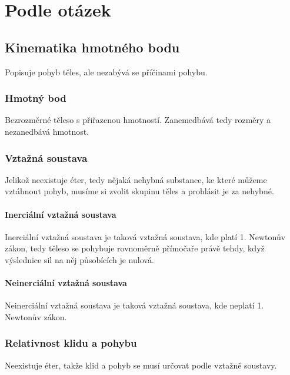 \documentclass[titlepage]{report}
\begin{document}
\part{Podle otázek}
\setcounter{chapter}{0}

\chapter{Kinematika hmotného bodu}
Popisuje pohyb těles, ale nezabývá se příčinami pohybu.
\section{Hmotný bod}
Bezrozměrné těleso s přiřazenou hmotností. Zanemedbává tedy rozměry a nezanedbává hmotnost.
\section{Vztažná soustava}
Jelikož neexistuje éter, tedy nějaká nehybná substance, ke které můžeme vztáhnout pohyb, musíme si zvolit skupinu těles a prohlásit je za nehybné.
\subsection{Inerciální vztažná soustava}
Inerciální vztažná soustava je taková vztažná soustava, kde platí 1. Newtonův zákon, tedy těleso se pohybuje rovnoměrně přímočaře právě tehdy, když výslednice sil na něj působících je nulová.
\subsection{Neinerciální vztažná soustava}
Neinerciální vztažná soustava je taková vztažná soustava, kde neplatí 1. Newtonův zákon.
\section{Relativnost klidu a pohybu}
Neexistuje éter, takže klid a pohyb se musí určovat podle vztažné soustavy.
\end{document}
